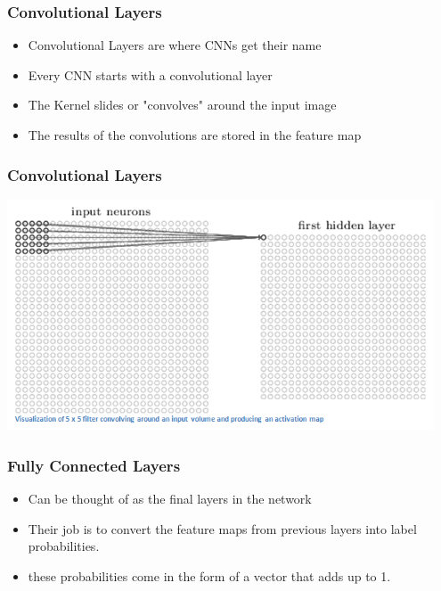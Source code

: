 \documentclass{beamer}
\begin{document}
\begin{frame}
  \frametitle{Convolutional Layers}
  \begin{itemize}
	\item Convolutional Layers are where CNNs get their name
	\pause
	\item Every CNN starts with a convolutional layer
	\pause
	\item The Kernel slides or "convolves" around the input image
	\pause
	\item The results of the convolutions are stored in the feature map
  \end{itemize}
\end{frame}

\begin{frame}
  \frametitle{Convolutional Layers}
   \includegraphics[width=0.95\textwidth]{ActivationMap.png}
       \\
\end{frame}

\begin{frame}
  \frametitle{Fully Connected Layers} 
  \begin{itemize}
	\item Can be thought of as the final layers in the network
	\pause
	\item Their job is to convert the feature maps from previous layers into label probabilities.
	\pause
	\item these probabilities come in the form of a vector that adds up to 1.
	
  \end{itemize}
\end{frame}
\end{document}
